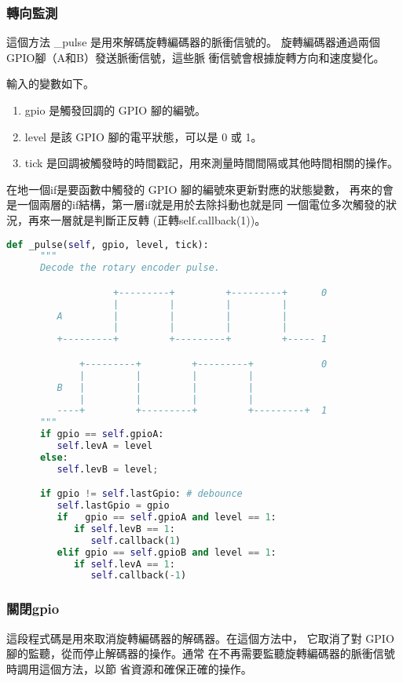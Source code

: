 \subsubsection{轉向監測}
這個方法 \_pulse 是用來解碼旋轉編碼器的脈衝信號的。
旋轉編碼器通過兩個GPIO腳（A和B）發送脈衝信號，這些脈
衝信號會根據旋轉方向和速度變化。

輸入的變數如下。
\begin{enumerate}
    \item gpio 是觸發回調的 GPIO 腳的編號。
    \item level 是該 GPIO 腳的電平狀態，可以是 0 或 1。
    \item tick 是回調被觸發時的時間戳記，用來測量時間間隔或其他時間相關的操作。
\end{enumerate}

在地一個if是要函數中觸發的 GPIO 腳的編號來更新對應的狀態變數，
再來的會是一個兩層的if結構，第一層if就是用於去除抖動也就是同
一個電位多次觸發的狀況，再來一層就是判斷正反轉
(正轉self.callback(1))。
\begin{lstlisting}[language=Python, caption=\_pulse方法]
   def _pulse(self, gpio, level, tick):
      """
      Decode the rotary encoder pulse.

                   +---------+         +---------+      0
                   |         |         |         |
         A         |         |         |         |
                   |         |         |         |
         +---------+         +---------+         +----- 1

             +---------+         +---------+            0
             |         |         |         |
         B   |         |         |         |
             |         |         |         |
         ----+         +---------+         +---------+  1
      """
      if gpio == self.gpioA:
         self.levA = level
      else:
         self.levB = level;

      if gpio != self.lastGpio: # debounce
         self.lastGpio = gpio
         if   gpio == self.gpioA and level == 1:
            if self.levB == 1:
               self.callback(1)
         elif gpio == self.gpioB and level == 1:
            if self.levA == 1:
               self.callback(-1)
\end{lstlisting}
\subsubsection{關閉gpio}
這段程式碼是用來取消旋轉編碼器的解碼器。在這個方法中，
它取消了對 GPIO 腳的監聽，從而停止解碼器的操作。通常
在不再需要監聽旋轉編碼器的脈衝信號時調用這個方法，以節
省資源和確保正確的操作。

